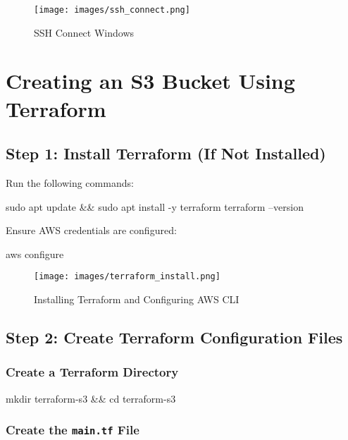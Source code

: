 \documentclass{article}
\begin{document}
\begin{figure}[h]
  \centering
  \texttt{[image: images/ssh\_connect.png]}
  \caption{SSH Connect Windows}
  \label{fig:ssh connect}
\end{figure}


\section{Creating an S3 Bucket Using Terraform}

\subsection{Step 1: Install Terraform (If Not Installed)}
Run the following commands:

\begin{tcolorbox}[colback=gray!10, colframe=black, title=Install Terraform]
sudo apt update && sudo apt install -y terraform
terraform --version
\end{tcolorbox}

Ensure AWS credentials are configured:

\begin{tcolorbox}[colback=gray!10, colframe=black, title=Configure AWS CLI]
aws configure
\end{tcolorbox}

\begin{figure}[H]
  \centering
  \texttt{[image: images/terraform\_install.png]}
  \caption{Installing Terraform and Configuring AWS CLI}
  \label{fig:terraform_install}
\end{figure}

\subsection{Step 2: Create Terraform Configuration Files}

\subsubsection{Create a Terraform Directory}

\begin{tcolorbox}[colback=gray!10, colframe=black, title=Create Directory]
mkdir terraform-s3 && cd terraform-s3
\end{tcolorbox}

\subsubsection{Create the \texttt{main.tf} File}
\end{document}
